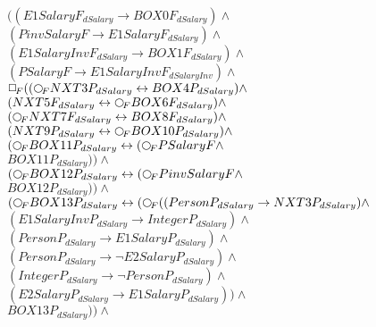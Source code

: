 \documentclass[a4paper,10pt]{article}
\begin{document}
 \newcommand{\nxt}{{\ensuremath\raisebox{0.25ex}{\text{\scriptsize$\bigcirc$}}}}
\newcommand{\Rdiamond}{\Diamond_{\!F}}
\newcommand{\Rbox}{\Box_{\!F}}
\newcommand{\Rnext}{\nxt_{\!F}}
\newcommand{\Ldiamond}{\Diamond_{\!P}}
\newcommand{\Lbox}{\Box_{\!P}}
\newcommand{\Lnext}{\nxt_{\!P}}
\newcommand{\SVdiamond}{\mathop{\ooalign{$\Diamond$ \cr \kern0.5ex
    \raisebox{0.35ex}{\scalebox{0.7}{$*$}}} \kern-0.9ex}}
\newcommand{\SVbox}{\mathop{\ooalign{$\Box$ \cr \kern0.42ex
    \raisebox{0.3ex}{\scalebox{0.7}{$*$}}} \kern-0.9ex}}


$((E1SalaryF_{dSalary} \rightarrow BOX0F_{dSalary}) \land $ \\ 
 $ (PinvSalaryF \rightarrow E1SalaryF_{dSalary}) \land $ \\ 
 $ (E1SalaryInvF_{dSalary} \rightarrow BOX1F_{dSalary}) \land $ \\ 
 $ (PSalaryF \rightarrow E1SalaryInvF_{dSalaryInv}) \land $ \\ 
 $  \Rbox (( \Rnext NXT3P_{dSalary} \leftrightarrow BOX4P_{dSalary}) \land $ \\ 
 $ (NXT5F_{dSalary} \leftrightarrow  \Rnext BOX6F_{dSalary}) \land $ \\ 
 $ ( \Rnext NXT7F_{dSalary} \leftrightarrow BOX8F_{dSalary}) \land $ \\ 
 $ (NXT9P_{dSalary} \leftrightarrow  \Rnext BOX10P_{dSalary}) \land $ \\ 
 $ ( \Rnext BOX11P_{dSalary} \leftrightarrow ( \Rnext PSalaryF \land $ \\ 
 $ BOX11P_{dSalary})) \land $ \\ 
 $ ( \Rnext BOX12P_{dSalary} \leftrightarrow ( \Rnext PinvSalaryF \land $ \\ 
 $ BOX12P_{dSalary})) \land $ \\ 
 $ ( \Rnext BOX13P_{dSalary} \leftrightarrow ( \Rnext ((PersonP_{dSalary} \rightarrow NXT3P_{dSalary}) \land $ \\ 
 $ (E1SalaryInvP_{dSalary} \rightarrow IntegerP_{dSalary}) \land $ \\ 
 $ (PersonP_{dSalary} \rightarrow E1SalaryP_{dSalary}) \land $ \\ 
 $ (PersonP_{dSalary} \rightarrow  \lnot E2SalaryP_{dSalary}) \land $ \\ 
 $ (IntegerP_{dSalary} \rightarrow  \lnot PersonP_{dSalary}) \land $ \\ 
 $ (E2SalaryP_{dSalary} \rightarrow E1SalaryP_{dSalary})) \land $ \\ 
 $ BOX13P_{dSalary})) \land $ \\ 
\end{document}
